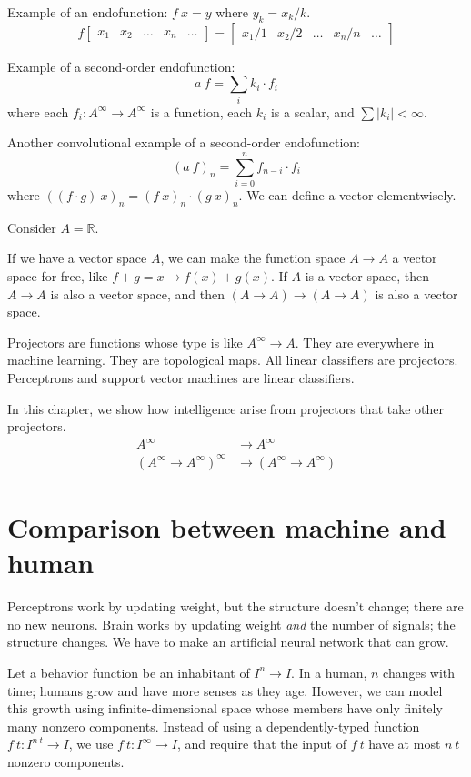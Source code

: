 Example of an endofunction:
\( f~x = y \) where \( y_k = x_k / k \).
\[
    f
    \begin{bmatrix}
        x_1 & x_2 & \ldots & x_n & \ldots
    \end{bmatrix}
    =
    \begin{bmatrix}
        x_1 / 1 & x_2 / 2 & \ldots & x_n / n & \ldots
    \end{bmatrix}
\]

Example of a second-order endofunction:
\[
    a~f = \sum_i k_i \cdot f_i
\]
where each \(f_i : A^\infty \to A^\infty\) is a function,
each \(k_i\) is a scalar, and \( \sum |k_i| < \infty \).

Another convolutional example of a second-order endofunction:
\[
    (a~f)_n = \sum_{i=0}^n f_{n-i} \cdot f_i
\]
where \(((f \cdot g)~x)_n = (f~x)_n \cdot (g~x)_n\).
We can define a vector elementwisely.

Consider \(A = \mathbb{R}\).

If we have a vector space \(A\),
we can make the function space \(A \to A\) a vector space for free,
like \(f + g = x \to f(x) + g(x)\).
If \(A\) is a vector space, then \(A \to A\) is also a vector space,
and then \((A \to A) \to (A \to A)\) is also a vector space.

Projectors are functions whose type is like \(A^\infty \to A\).
They are everywhere in machine learning.
They are topological maps.
All linear classifiers are projectors.
Perceptrons and support vector machines are linear classifiers.

In this chapter, we show how intelligence arise
from projectors that take other projectors.
\begin{align*}
    A^\infty &\to A^\infty
    \\
    (A^\infty \to A^\infty)^\infty &\to (A^\infty \to A^\infty)
\end{align*}

\section{Comparison between machine and human}

Perceptrons work by updating weight, but the structure doesn't change;
there are no new neurons.
Brain works by updating weight \emph{and} the number of signals;
the structure changes.
We have to make an artificial neural network that can grow.

Let a behavior function be an inhabitant of \(I^n \to I\).
In a human, \(n\) changes with time;
humans grow and have more senses as they age.
However, we can model this growth
using infinite-dimensional space whose
members have only finitely many nonzero components.
Instead of using a dependently-typed function \(f~t : I^{n~t} \to I\),
we use \(f~t : I^\infty \to I\),
and require that the input of \(f~t\) have at most \(n~t\) nonzero components.

